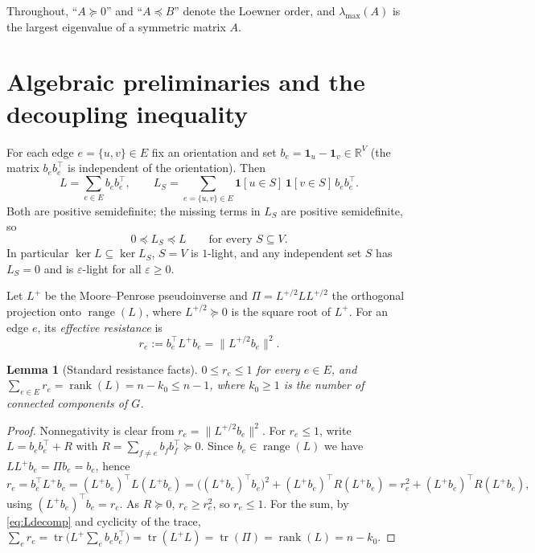 \documentclass[12pt]{article}
\newtheorem{lemma}{Lemma}
\theoremstyle{definition}
\DeclareMathOperator{\tr}{tr}
\DeclareMathOperator{\rank}{rank}
\newcommand{\bR}{\mathbb{R}}
\newcommand{\eps}{\varepsilon}
\newcommand{\psd}{\succeq 0}
\begin{document}
Throughout, ``$A\psd$'' and ``$A\preceq B$'' denote the Loewner order, and $\lambda_{\max}(A)$ is the
largest eigenvalue of a symmetric matrix $A$.

\section{Algebraic preliminaries and the decoupling inequality}\label{sec:basics}

For each edge $e=\{u,v\}\in E$ fix an orientation and set $b_e=\mathbf 1_u-\mathbf 1_v\in\bR^V$ (the
matrix $b_eb_e^\top$ is independent of the orientation). Then
\begin{equation}\label{eq:Ldecomp}
L=\sum_{e\in E} b_e b_e^\top,
\qquad
L_S=\sum_{e=\{u,v\}\in E}\mathbf 1[u\in S]\,\mathbf 1[v\in S]\,b_e b_e^\top .
\end{equation}
Both are positive semidefinite; the missing terms in $L_S$ are positive semidefinite, so
\begin{equation}\label{eq:LSleqL}
0\preceq L_S\preceq L\qquad\text{for every }S\subseteq V .
\end{equation}
In particular $\ker L\subseteq\ker L_S$, $S=V$ is $1$-light, and any independent set $S$ has $L_S=0$
and is $\eps$-light for all $\eps\ge0$.

Let $L^{+}$ be the Moore--Penrose pseudoinverse and $\Pi=L^{+/2}LL^{+/2}$ the orthogonal projection
onto $\operatorname{range}(L)$, where $L^{+/2}\psd$ is the square root of $L^{+}$. For an edge $e$,
its \emph{effective resistance} is
\begin{equation}\label{eq:resistance}
r_e:=b_e^\top L^{+}b_e=\big\|L^{+/2}b_e\big\|^2 .
\end{equation}

\begin{lemma}[Standard resistance facts]\label{lem:resfacts}
$0\le r_e\le 1$ for every $e\in E$, and $\sum_{e\in E}r_e=\rank(L)=n-k_0\le n-1$, where $k_0\ge1$ is
the number of connected components of $G$.
\end{lemma}
\begin{proof}
Nonnegativity is clear from $r_e=\|L^{+/2}b_e\|^2$. For $r_e\le1$, write
$L=b_eb_e^\top+R$ with $R=\sum_{f\ne e}b_fb_f^\top\psd$. Since $b_e\in\operatorname{range}(L)$ we have
$LL^{+}b_e=\Pi b_e=b_e$, hence
\[
r_e=b_e^\top L^{+}b_e=(L^{+}b_e)^\top L (L^{+}b_e)
=\big((L^{+}b_e)^\top b_e\big)^2+(L^{+}b_e)^\top R (L^{+}b_e)
=r_e^2+(L^{+}b_e)^\top R (L^{+}b_e),
\]
using $(L^{+}b_e)^\top b_e=r_e$. As $R\psd$, $r_e\ge r_e^2$, so $r_e\le1$. For the sum, by
\eqref{eq:Ldecomp} and cyclicity of the trace,
$\sum_e r_e=\tr\!\big(L^{+}\sum_e b_eb_e^\top\big)=\tr(L^{+}L)=\tr(\Pi)=\rank(L)=n-k_0$.
\end{proof}
\end{document}
